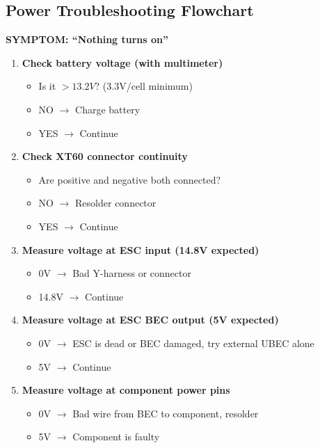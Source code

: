 \documentclass[11pt,letterpaper]{article}
\begin{document}
\subsection{Power Troubleshooting Flowchart}

\textbf{SYMPTOM: ``Nothing turns on''}

\begin{enumerate}
\item \textbf{Check battery voltage (with multimeter)}
\begin{itemize}
\item Is it $> 13.2V$? (3.3V/cell minimum)
\item NO $\rightarrow$ Charge battery
\item YES $\rightarrow$ Continue
\end{itemize}

\item \textbf{Check XT60 connector continuity}
\begin{itemize}
\item Are positive and negative both connected?
\item NO $\rightarrow$ Resolder connector
\item YES $\rightarrow$ Continue
\end{itemize}

\item \textbf{Measure voltage at ESC input (14.8V expected)}
\begin{itemize}
\item 0V $\rightarrow$ Bad Y-harness or connector
\item 14.8V $\rightarrow$ Continue
\end{itemize}

\item \textbf{Measure voltage at ESC BEC output (5V expected)}
\begin{itemize}
\item 0V $\rightarrow$ ESC is dead or BEC damaged, try external UBEC alone
\item 5V $\rightarrow$ Continue
\end{itemize}

\item \textbf{Measure voltage at component power pins}
\begin{itemize}
\item 0V $\rightarrow$ Bad wire from BEC to component, resolder
\item 5V $\rightarrow$ Component is faulty
\end{itemize}
\end{enumerate}
\end{document}

